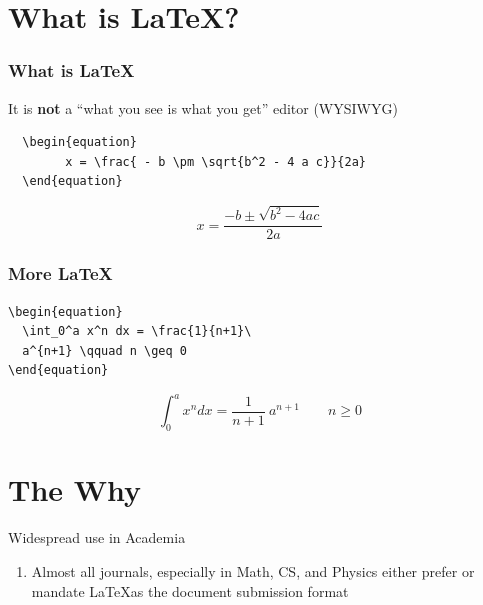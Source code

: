 \documentclass{beamer}
\begin{document}
\section{What is \LaTeX?}

\begin{frame}[fragile]
  \frametitle{What is \LaTeX}

  It is \textbf{not} a ``what you see is what you get'' editor (WYSIWYG)

\begin{verbatim}
  \begin{equation}
        x = \frac{ - b \pm \sqrt{b^2 - 4 a c}}{2a}
  \end{equation}
\end{verbatim}
\par
  \hrulefill\par
  \begin{equation}
        x = \frac{ - b \pm \sqrt{b^2 - 4 a c}}{2a}
  \end{equation}

\end{frame}

\begin{frame}[fragile]
\frametitle{More \LaTeX}
\begin{verbatim}
\begin{equation}
  \int_0^a x^n dx = \frac{1}{n+1}\
  a^{n+1} \qquad n \geq 0
\end{equation}
\end{verbatim}\par
  \hrulefill\par

\begin{equation}
  \int_0^a x^n dx = \frac{1}{n+1}\
  a^{n+1} \qquad n \geq 0
\end{equation}

\end{frame}

\section{The Why}


\begin{frame}{Widespread use in Academia}

  \begin{enumerate}
    \item {Almost all journals, especially in Math, CS, and Physics
      either prefer or mandate \LaTeX as the document submission
      format}
   \end{enumerate}

\vskip 1cm

\end{frame}
\end{document}

